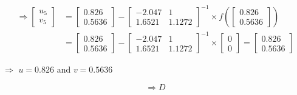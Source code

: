 \documentclass[a4paper,11pt]{article}
\begin{document}
\[ \begin{array}{ll}
    \Rightarrow  \begin{bmatrix} u_{5} \\ v_{5} \end{bmatrix} &= \begin{bmatrix} 0.826 \\ 0.5636  \end{bmatrix} - \begin{bmatrix} -2.047 & 1  \\ 1.6521 & 1.1272  \end{bmatrix}^{-1} \times f\left(\begin{bmatrix} 0.826 \\ 0.5636 \end{bmatrix}\right) \\
    &= \begin{bmatrix} 0.826 \\ 0.5636  \end{bmatrix} - \begin{bmatrix} -2.047 & 1  \\ 1.6521 & 1.1272  \end{bmatrix}^{-1} \times \begin{bmatrix} 0 \\ 0 \end{bmatrix} = \begin{bmatrix} 0.826 \\ 0.5636 \end{bmatrix} 
\end{array} \]


$\Rightarrow$ $u = 0.826$  and $v = 0.5636$

\[ \Rightarrow \boxed{D} \]
\end{document}

